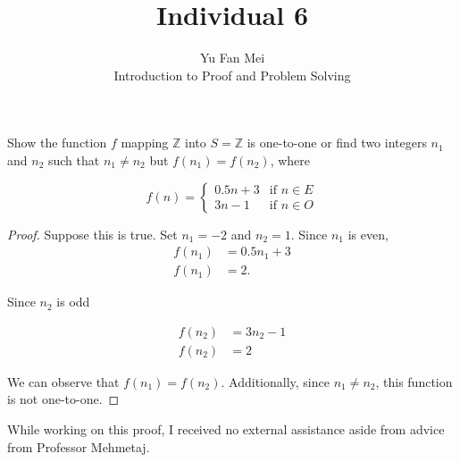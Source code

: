 \documentclass[12pt]{article}
\newenvironment{problem}[2][Problem]{\begin{trivlist}
\item[\hskip \labelsep {\bfseries #1}\hskip \labelsep {\bfseries #2.}]}{\end{trivlist}}
\begin{document}

\title{Individual 6}%
\author{Yu Fan Mei\\ %
	Introduction to Proof and Problem Solving} %

\maketitle

\begin{problem}{12} %
    Show the function $f$ mapping $\mathbb{Z}$ into $S = \mathbb{Z} $ is one-to-one or find two integers $n_1$ and $n_2$ such that $n_1 \neq n_2$ but $f(n_1) = f(n_2)$, where

    $$f(n) = 
        \begin{cases} 
        0.5n + 3 & \text{if } n \in E \\ 
        3n - 1 & \text{if } n \in O 
        \end{cases}$$


    
    

\end{problem}

\begin{proof} Suppose this is true. Set $n_1 = -2$ and $n_2 = 1$. Since $n_1$ is even, 
    \begin{align*} 
        f(n_1) & = 0.5n_1 + 3 \\
        f(n_1) & = 2.
    \end{align*}
    
    Since $n_2$ is odd

    \begin{align*} 
        f(n_2) & = 3n_2 - 1 \\
        f(n_2) & = 2
    \end{align*}

    We can observe that $f(n_1) = f(n_2)$. Additionally, since $n_1 \neq n_2$, this function is not one-to-one.


\end{proof}


\noindent While working on this proof, I received no external assistance aside from advice from Professor Mehmetaj.
\end{document}
